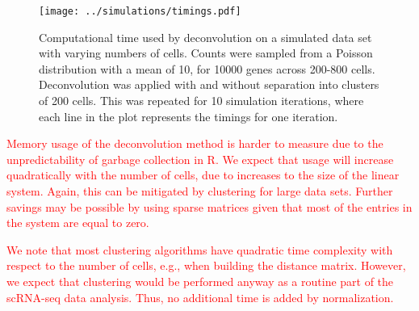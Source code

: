 \documentclass{article}
\newcommand\revised[1]{\textcolor{red}{#1}}
\begin{document}
\begin{figure}[btp]
    \begin{center}
        \texttt{[image: ../simulations/timings.pdf]}
    \end{center}
    \caption{
        Computational time used by deconvolution on a simulated data set with varying numbers of cells.
        Counts were sampled from a Poisson distribution with a mean of 10, for 10000 genes across 200-800 cells.
        Deconvolution was applied with and without separation into clusters of 200 cells.
        This was repeated for 10 simulation iterations, where each line in the plot represents the timings for one iteration.
    }
    \label{fig:timings}
\end{figure}

\revised{Memory usage of the deconvolution method is harder to measure due to the unpredictability of garbage collection in R.
We expect that usage will increase quadratically with the number of cells, due to increases to the size of the linear system.
Again, this can be mitigated by clustering for large data sets.
Further savings may be possible by using sparse matrices given that most of the entries in the system are equal to zero.}

\revised{We note that most clustering algorithms have quadratic time complexity with respect to the number of cells, e.g., when building the distance matrix.
However, we expect that clustering would be performed anyway as a routine part of the scRNA-seq data analysis.
Thus, no additional time is added by normalization.}
   
\end{document}
